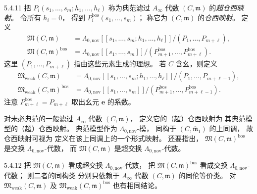\begin{definition}{5.4.11}\label{def:5-4-11}
把
$P_i(s_1,\ldots,s_m;
h_1,\ldots,h_\ell)$
称为典范滤过 $A_\infty$
代数 $(C,\mathfrak m)$
的\emph{超仓西映射}。
令所有 $h_i=0$，
得到
$P_i^{\mathrm{bos}}
(s_1,\ldots,s_m)$；
称它为 $(C,\mathfrak m)$
的\emph{仓西映射}。
定义
\[
\begin{aligned}
\mathfrak M(C,\mathfrak m)
&=
\Lambda_{0,\mathrm{nov}}
[[s_1,\ldots,s_m;h_1,\ldots,h_\ell]]
/(P_1,\ldots,P_{m+\ell}),\\
\mathfrak M(C,\mathfrak m)^{\mathrm{bos}}
&=
\Lambda_{0,\mathrm{nov}}
[[s_1,\ldots,s_m]]
/(P_{m+1}^{\mathrm{bos}},
\ldots,P_{m+\ell}^{\mathrm{bos}}).
\end{aligned}
\]
这里
$(P_1,\ldots,P_{m+\ell})$
指由这些元素生成的理想。
若 $C$ 含幺，则定义
\[
\begin{aligned}
\mathfrak M_{\mathrm{weak}}(C,\mathfrak m)
&=
\Lambda_{0,\mathrm{nov}}
[[s_1,\ldots,s_m;h_1,\ldots,h_\ell]]
/(P_1,\ldots,P_{m+\ell-1}),\\
\mathfrak M_{\mathrm{weak}}(C,\mathfrak m)^{\mathrm{bos}}
&=
\Lambda_{0,\mathrm{nov}}
[[s_1,\ldots,s_m]]
/(P_{m+1}^{\mathrm{bos}},
\ldots,P_{m+\ell-1}^{\mathrm{bos}}).
\end{aligned}
\]
注意
$P_{m+\ell}^{\mathrm{bos}}
=P_{m+\ell}$
取出幺元 $\mathbf e$ 的系数。
\end{definition}

对未必典范的一般滤过
$A_\infty$ 代数 $(C,\mathfrak m)$，
定义它的（超）仓西映射为
其典范模型的（超）仓西映射。
典范模型作为
$\Lambda_{0,\mathrm{nov}}$-模，
同构于 $(C,\overline{\mathfrak m}_1)$
的上同调，
故仓西映射可视为
定义在该上同调上的一个形式映射。
还要指出，
$\mathfrak M(C,\mathfrak m)^{\mathrm{bos}}$
是交换
$\Lambda_{0,\mathrm{nov}}$-代数，
而 $\mathfrak M(C,\mathfrak m)$
是超交换
$\Lambda_{0,\mathrm{nov}}$-代数。

\begin{theorem}{5.4.12}\label{thm:5-4-12}
把 $\mathfrak M(C,\mathfrak m)$
看成超交换
$\Lambda_{0,\mathrm{nov}}$-代数，
把
$\mathfrak M(C,\mathfrak m)^{\mathrm{bos}}$
看成交换
$\Lambda_{0,\mathrm{nov}}$-代数；
则二者的同构类
分别只依赖于
$A_\infty$ 代数
$(C,\mathfrak m)$ 的同伦等价类。
对
$\mathfrak M_{\mathrm{weak}}(C,\mathfrak m)$
及
$\mathfrak M_{\mathrm{weak}}(C,\mathfrak m)
^{\mathrm{bos}}$
也有相同结论。
\end{theorem}

